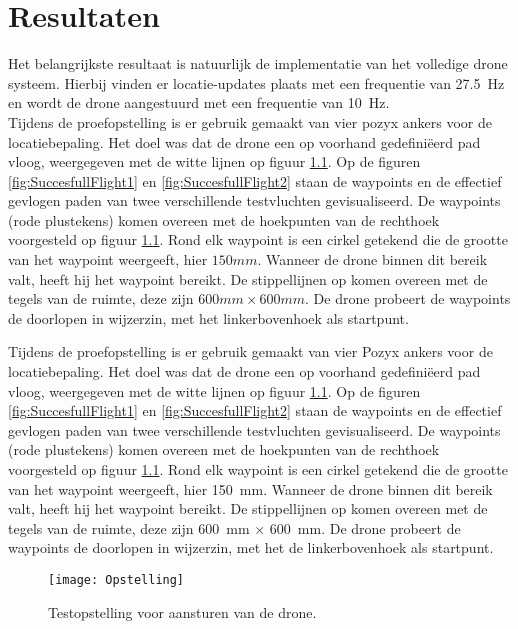 \chapter{Resultaten}

Het belangrijkste resultaat is natuurlijk de implementatie van het volledige drone systeem. Hierbij vinden er locatie-updates plaats met een frequentie van \SI{27.5}{\Hz} en wordt de drone aangestuurd met een frequentie van \SI{10}{\Hz}.\\

Tijdens de proefopstelling is er gebruik gemaakt van vier pozyx ankers voor de locatiebepaling. Het doel was dat de drone een op voorhand gedefini\"eerd pad vloog, weergegeven met de witte lijnen op figuur \ref{fig:Opstelling}. Op de figuren \ref{fig:SuccesfullFlight1} en  \ref{fig:SuccesfullFlight2} staan de waypoints en de effectief gevlogen paden van twee verschillende testvluchten gevisualiseerd. De waypoints (rode plustekens) komen overeen met de hoekpunten van de rechthoek voorgesteld op figuur \ref{fig:Opstelling}. Rond elk waypoint is een cirkel getekend die de grootte van het waypoint weergeeft, hier $150mm$. Wanneer de drone binnen dit bereik valt, heeft hij het waypoint bereikt. De stippellijnen op komen overeen met de tegels van de ruimte, deze zijn $600mm \times 600mm$. De drone probeert de waypoints de doorlopen in wijzerzin, met het linkerbovenhoek als startpunt. 


Tijdens de proefopstelling is er gebruik gemaakt van vier Pozyx ankers voor de locatiebepaling.
Het doel was dat de drone een op voorhand gedefini\"eerd pad vloog, weergegeven met de witte lijnen op figuur \ref{fig:Opstelling}.
Op de figuren \ref{fig:SuccesfullFlight1} en \ref{fig:SuccesfullFlight2} staan de waypoints en de effectief gevlogen paden van twee verschillende testvluchten gevisualiseerd.
De waypoints (rode plustekens) komen overeen met de hoekpunten van de rechthoek voorgesteld op figuur \ref{fig:Opstelling}.
Rond elk waypoint is een cirkel getekend die de grootte van het waypoint weergeeft, hier \SI{150}{\mm}.
Wanneer de drone binnen dit bereik valt, heeft hij het waypoint bereikt.
De stippellijnen op komen overeen met de tegels van de ruimte, deze zijn \SI{600}{\mm} $\times$ \SI{600}{\mm}.
De drone probeert de waypoints de doorlopen in wijzerzin, met het de linkerbovenhoek als startpunt.
\begin{figure}[p]
	\centering
	\texttt{[image: Opstelling]}
	\caption[Opstelling testvluchten]{Testopstelling voor aansturen van de drone.}
	\label{fig:Opstelling}
\end{figure}

